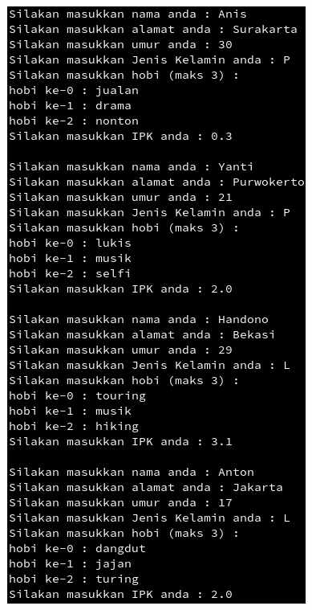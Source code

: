 \documentclass[a4paper,12pt]{article}
\begin{document}
\begin{center}
    \includegraphics[scale=.7]{lat2.png}

\end{center}
\end{document}
